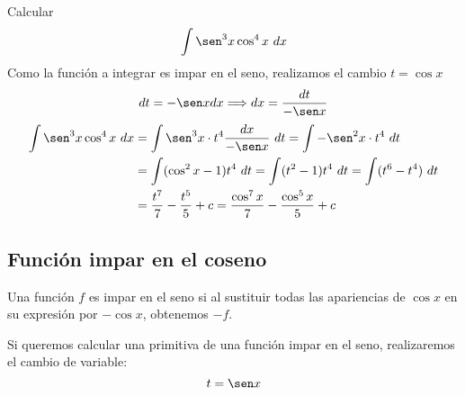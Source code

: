 \begin{ejemplo}
    Calcular
    \begin{equation*}
        \displaystyle\int \sen^3 x \cos^4 x~dx 
    \end{equation*}
    Como la función a integrar es impar en el seno, realizamos el cambio $t = \cos x$
    \begin{equation*}
        dt = -\sen x dx \Longrightarrow dx = \dfrac{dt}{-\sen x}
    \end{equation*}
    \begin{align*}
        \displaystyle\int \sen^3x\cos^4x~dx  &= \displaystyle\int \sen^3x\cdot t^4 \dfrac{dx}{-\sen x}~dt = \displaystyle\int -\sen^2 x \cdot t^4~dt  \\
                                             &= \displaystyle\int (\cos^2 x - 1)t^4~dt = \displaystyle\int (t^2-1)t^4~dt = \displaystyle\int (t^6 - t^4)~dt \\
                                             &= \dfrac{t^7}{7}-\dfrac{t^5}{5} + c =  \dfrac{\cos^7 x}{7}-\dfrac{\cos^5x}{5} + c
    \end{align*}
\end{ejemplo}

\subsection{Función impar en el coseno}
\begin{definicion}
    Una función $f$ es impar en el seno si al sustituir todas las apariencias de $\cos x$ en su expresión por $-\cos x$, obtenemos $-f$.
\end{definicion}
Si queremos calcular una primitiva de una función impar en el seno, realizaremos el cambio de variable:
\begin{equation*}
    t = \sen x
\end{equation*}

